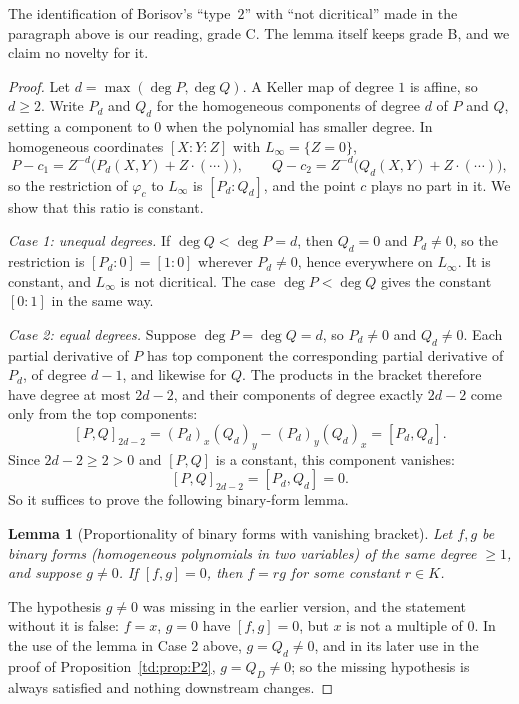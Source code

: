 \documentclass[a4paper,11pt]{article}
\theoremstyle{jsplain}
\newtheorem{lemma}[theorem]{Lemma}
\theoremstyle{jsdef}
\theoremstyle{jsrem}
\begin{document}
The identification of Borisov's ``type~$2$'' with ``not dicritical'' made in the paragraph above
is our reading, grade C. The lemma itself keeps grade B, and we claim no novelty for it.

\begin{proof}
Let $d = \max(\deg P, \deg Q)$. A Keller map of degree $1$ is affine, so $d \geq 2$. Write $P_d$
and $Q_d$ for the homogeneous components of degree $d$ of $P$ and $Q$, setting a component to $0$
when the polynomial has smaller degree. In homogeneous coordinates $[X:Y:Z]$ with
$L_\infty = \{Z = 0\}$,
\[
P - c_1 = Z^{-d}\big(P_d(X,Y) + Z\cdot(\cdots)\big), \qquad
Q - c_2 = Z^{-d}\big(Q_d(X,Y) + Z\cdot(\cdots)\big),
\]
so the restriction of $\varphi_c$ to $L_\infty$ is $[P_d : Q_d]$, and the point $c$ plays no
part in it. We show that this ratio is constant.

\emph{Case 1: unequal degrees.} If $\deg Q < \deg P = d$, then $Q_d = 0$ and $P_d \neq 0$, so
the restriction is $[P_d : 0] = [1 : 0]$ wherever $P_d \neq 0$, hence everywhere on
$L_\infty$. It is constant, and $L_\infty$ is not dicritical. The case $\deg P < \deg Q$ gives the
constant $[0 : 1]$ in the same way.

\emph{Case 2: equal degrees.} Suppose $\deg P = \deg Q = d$, so $P_d \neq 0$ and $Q_d \neq 0$.
Each partial derivative of $P$ has top component the corresponding partial derivative of $P_d$,
of degree $d-1$, and likewise for $Q$. The products in the bracket therefore have degree at most
$2d - 2$, and their components of degree exactly $2d - 2$ come only from the top components:
\[
[P,Q]_{2d-2} = (P_d)_x (Q_d)_y - (P_d)_y (Q_d)_x = [P_d, Q_d].
\]
Since $2d - 2 \geq 2 > 0$ and $[P,Q]$ is a constant, this component vanishes:
\begin{equation}\label{td:eq:top-bracket}
[P,Q]_{2d-2} = [P_d, Q_d] = 0.
\end{equation}
So it suffices to prove the following binary-form lemma.

\begin{lemma}[Proportionality of binary forms with vanishing bracket]\label{td:lem:binary}
Let $f, g$ be binary forms (homogeneous polynomials in two variables) of the same degree
$\geq 1$, and suppose $g \neq 0$. If $[f,g] = 0$, then $f = r g$ for some constant $r \in K$.
\end{lemma}

The hypothesis $g \neq 0$ was missing in the earlier version, and the statement without it is
false: $f = x$, $g = 0$ have $[f,g] = 0$, but $x$ is not a multiple of $0$. In the use of the
lemma in Case 2 above, $g = Q_d \neq 0$, and in its later use in the proof of
Proposition~\ref{td:prop:P2}, $g = Q_D \neq 0$; so the missing hypothesis is always satisfied
and nothing downstream changes.


\end{proof}
\end{document}
